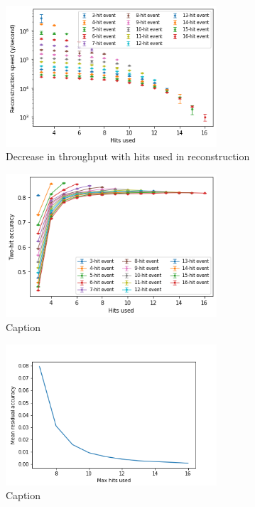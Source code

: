 \begin{figure}
    \centering
    \includegraphics[width=0.7\textwidth]{graphs/pi_hits_v_hitsUsed_speed.png}
    \caption{Decrease in throughput with hits used in reconstruction}
    \label{fig:hits_v_hitsUsed}
\end{figure}

\begin{figure}
    \centering
    \includegraphics[width=0.7\textwidth]{graphs/pi_hits_v_hitsUsed_accuracy.png}
    \caption{Caption}
    \label{fig:my_label}
\end{figure}

\begin{figure}
    \centering
    \includegraphics[width=0.7\textwidth]{graphs/mean_resid_acc.png}
    \caption{Caption}
    \label{fig:my_label}
\end{figure}

